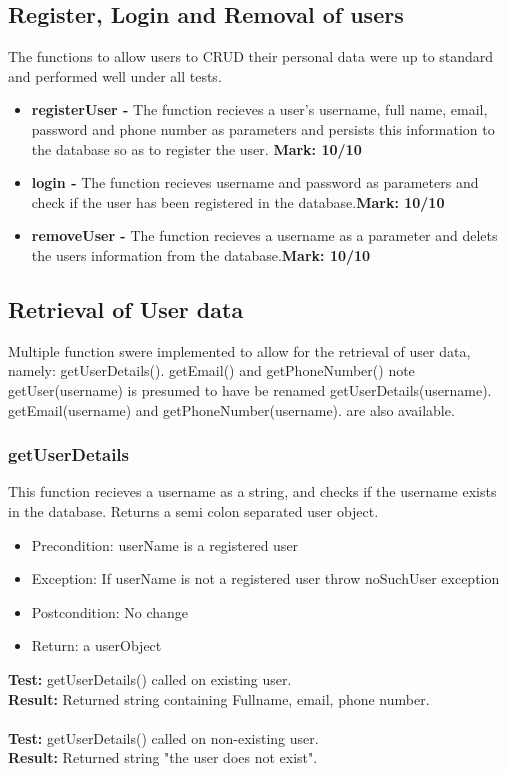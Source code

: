 \documentclass[12pt]{article}
\begin{document}
\subsection{Register, Login and Removal of users}
	The functions to allow users to CRUD their personal data were up to standard and performed well under all tests.
	
	\begin{itemize}
		\item \textbf{registerUser - }The function recieves a user's username, full name, email, password and phone number as parameters and persists this information to the 				database so as to register the user. \textbf{Mark: 10/10}
		\item\textbf{login - }The function recieves username and password as parameters and check if the user has been registered in the database.\textbf{Mark: 10/10}
		\item \textbf{removeUser - } The function recieves a username as a parameter and delets the users information from the database.\textbf{Mark: 10/10}
		\end{itemize}
\pagebreak	
\subsection{Retrieval of User data}
	Multiple function swere implemented to allow for the retrieval of user data, namely: getUserDetails(). getEmail() and getPhoneNumber()
	\indent *note getUser(username) is presumed to have be renamed getUserDetails(username). getEmail(username) and getPhoneNumber(username). are also available.
	
	\subsubsection{getUserDetails}
		This function recieves a username as a string, and checks if the username exists in the database. Returns a semi colon separated user object.
	
	\begin{itemize}
		\item Precondition: userName is a registered user
		\item Exception: If userName is not a registered user throw noSuchUser exception
		\item Postcondition: No change
		\item Return: a userObject
	\end{itemize}
		
	\noindent \textbf{Test:} getUserDetails() called on existing user.\\
	\textbf{Result:} Returned string containing Fullname, email, phone number.\\\\
	\textbf{Test:} getUserDetails() called on non-existing user.\\
	\textbf{Result:} Returned string "the user does not exist".\\
	
\end{document}
